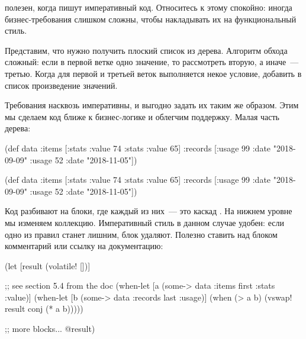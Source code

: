  полезен, когда пишут императивный код. Относитесь к этому
спокойно: иногда бизнес-требования слишком сложны, чтобы накладывать их на
функциональный стиль.

Представим, что нужно получить плоский список из дерева. Алгоритм обхода
сложный: если в первой ветке одно значение, то рассмотреть вторую, а иначе~---
третью. Когда для первой и третьей веток выполняется некое условие, добавить в
список произведение значений.


Требования насквозь императивны, и выгодно задать их таким же образом. Этим мы
сделаем код ближе к бизнес-логике и облегчим поддержку. Малая часть дерева:

\ifnarrow

\begin{clojure}
(def data
  {:items [{:stats {:value 74}}
           {:stats {:value 65}}]
   :records [{:usage 99
              :date "2018-09-09"}
             {:usage 52
              :date "2018-11-05"}]})
\end{clojure}

\else

\begin{clojure}
(def data
  {:items [{:stats {:value 74}}
           {:stats {:value 65}}]
   :records [{:usage 99 :date "2018-09-09"}
             {:usage 52 :date "2018-11-05"}]})
\end{clojure}

\fi

Код разбивают на блоки, где каждый из них~--- это каскад . На
нижнем уровне мы изменяем коллекцию. Императивный стиль в данном случае удобен:
если одно из правил станет лишним, блок удаляют. Полезно ставить над блоком
комментарий или ссылку на документацию:

\ifnarrow

\begin{clojure}
(let [result (volatile! [])]

  ;; see section 5.4 from the doc
  (when-let [a (some-> data
                       :items
                       first
                       :stats
                       :value)]
    (when-let [b (some-> data
                       :records
                       last
                       :usage)]
      (when (> a b)
        (vswap! result conj (* a b)))))

  ;; more blocks...
  @result)
\end{clojure}

